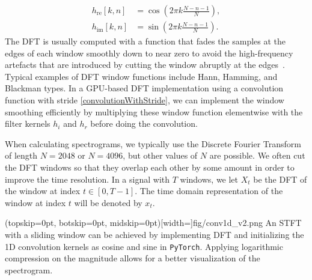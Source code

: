 \documentclass{ieeeaccess}
\newcommand{\nbh}[1]{\texttt{#1}}
\begin{document}
\begin{align}
    h_{\text{re}}[k,n] &= \cos(2\pi k \frac{N-n-1}{N}),\\
    h_{\text{im}}[k,n] &= \sin(2\pi k \frac{N-n-1}{N}).
\end{align}
The DFT is usually computed with a function that fades the samples at the edges of each window smoothly down to near zero to avoid the high-frequency artefacts that are introduced by cutting the window abruptly at the edges~\cite{Oppenheim1989DiscretetimeSP}. Typical examples of DFT window functions include Hann, Hamming, and Blackman types. In a GPU-based DFT implementation using a convolution function with stride \eqref{convolutionWithStride}, we can implement the window smoothing efficiently by multiplying these window function elementwise with the filter kernels $h_i$ and $h_r$ before doing the convolution. 


When calculating spectrograms, we typically use the Discrete Fourier Transform of length $N=2048$ or $N=4096$, but other values of $N$ are possible. We often cut the DFT windows so that they overlap each other by some amount in order to improve the time resolution. In a signal with $T$ windows, we let $X_t$  be the DFT of the window at index $t \in [0,T-1]$. The time domain representation of the window at index $t$ will be denoted by $x_t$. 






\Figure[t!](topskip=0pt, botskip=0pt, midskip=0pt)[width=\linewidth]{fig/conv1d_v2.png}
{An STFT with a sliding window can be achieved by implementing DFT and initializing the 1D convolution kernels as cosine and sine in \nbh{PyTorch}. Applying logarithmic compression on the magnitude allows for a better visualization of the spectrogram. \label{fig: conv1d}}
\end{document}
